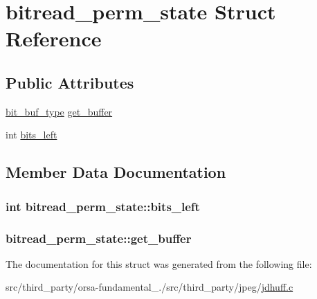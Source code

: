 \hypertarget{structbitread__perm__state}{}\section{bitread\+\_\+perm\+\_\+state Struct Reference}
\label{structbitread__perm__state}
\subsection*{Public Attributes}
\begin{DoxyCompactItemize}
\item 
\hyperlink{jdhuff_8c_ab2d47e546a8ed21c68e22f54535574a8}{bit\+\_\+buf\+\_\+type} \hyperlink{structbitread__perm__state_a39dce6ef08822b3ae5c8ba2329d079bd}{get\+\_\+buffer}
\item 
int \hyperlink{structbitread__perm__state_ac138b781f4681902dec2e44007f672c4}{bits\+\_\+left}
\end{DoxyCompactItemize}


\subsection{Member Data Documentation}
\hypertarget{structbitread__perm__state_ac138b781f4681902dec2e44007f672c4}{}
\subsubsection[{bits\+\_\+left}]{\setlength{\rightskip}{0pt plus 5cm}int bitread\+\_\+perm\+\_\+state\+::bits\+\_\+left}\label{structbitread__perm__state_ac138b781f4681902dec2e44007f672c4}
\hypertarget{structbitread__perm__state_a39dce6ef08822b3ae5c8ba2329d079bd}{}
\subsubsection[{get\+\_\+buffer}]{ bitread\+\_\+perm\+\_\+state\+::get\+\_\+buffer}\label{structbitread__perm__state_a39dce6ef08822b3ae5c8ba2329d079bd}


The documentation for this struct was generated from the following file\+:\begin{DoxyCompactItemize}
\item 
src/third\+\_\+party/orsa-\/fundamental\+\_./src/third\+\_\+party/jpeg/\hyperlink{jdhuff_8c}{jdhuff.\+c}\end{DoxyCompactItemize}
